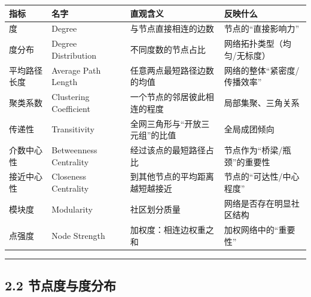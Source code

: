 {\def\LTcaptype{none} %
\begin{longtable}[]{@{}
  >{\raggedright\arraybackslash}p{}
  >{\raggedright\arraybackslash}p{}
  >{\raggedright\arraybackslash}p{}
  >{\raggedright\arraybackslash}p{}@{}}
\toprule\noalign{}
\begin{minipage}[b]{\linewidth}\raggedright
指标
\end{minipage} & \begin{minipage}[b]{\linewidth}\raggedright
名字
\end{minipage} & \begin{minipage}[b]{\linewidth}\raggedright
直观含义
\end{minipage} & \begin{minipage}[b]{\linewidth}\raggedright
反映什么
\end{minipage} \\
\midrule\noalign{}
\endhead
\bottomrule\noalign{}
\endlastfoot
度 & Degree & 与节点直接相连的边数 & 节点的``直接影响力'' \\
度分布 & Degree Distribution & 不同度数的节点占比 &
网络拓扑类型（均匀/无标度） \\
平均路径长度 & Average Path Length & 任意两点最短路径边数的均值 &
网络的整体``紧密度/传播效率'' \\
聚类系数 & Clustering Coefficient & 一个节点的邻居彼此相连的程度 &
局部集聚、三角关系 \\
传递性 & Transitivity & 全网三角形与``开放三元组''的比值 &
全局成团倾向 \\
介数中心性 & Betweenness Centrality & 经过该点的最短路径占比 &
节点作为``桥梁/瓶颈''的重要性 \\
接近中心性 & Closeness Centrality & 到其他节点的平均距离越短越接近 &
节点的``可达性/中心程度'' \\
模块度 & Modularity & 社区划分质量 & 网络是否存在明显社区结构 \\
点强度 & Node Strength & 加权度：相连边权重之和 &
加权网络中的``重要性'' \\
\end{longtable}
}

\begin{center}\rule{0.5\linewidth}{0.5pt}\end{center}

\subsection{2.2
节点度与度分布}\label{ux8282ux70b9ux5ea6ux4e0eux5ea6ux5206ux5e03}


